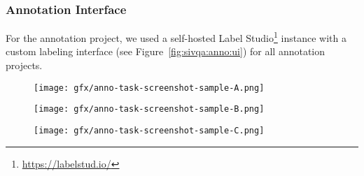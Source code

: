 \subsubsection{\sivqa Annotation Interface}
\label{appendix:sec:sivqa:anno:ui}
%
For the annotation project, we used a self-hosted Label Studio\footnote{\url{https://labelstud.io/}} instance with a custom labeling interface (see Figure~\ref{fig:sivqa:anno:ui}) for all annotation projects.
%
\begin{figure*}
    \centering
    \begin{subfigure}[b]{1.\textwidth}
         \centering
         \texttt{[image: gfx/anno-task-screenshot-sample-A.png]}
     \end{subfigure}
     
     \begin{subfigure}[b]{1.\textwidth}
         \centering
         \texttt{[image: gfx/anno-task-screenshot-sample-B.png]}
     \end{subfigure}

     \begin{subfigure}[b]{1.\textwidth}
         \centering
         \texttt{[image: gfx/anno-task-screenshot-sample-C.png]}
     \end{subfigure}
    \caption{Three screenshots showing examples of the Label Studio interface used in our \sivqa annotation tasks.}
    \label{fig:sivqa:anno:ui}
\end{figure*}

